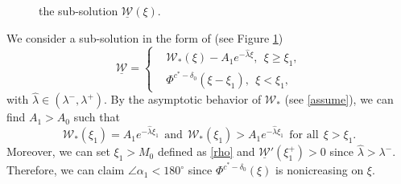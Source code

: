 \documentclass[11pt,a4paper]{article}
\numberwithin{equation}{section}
\numberwithin{figure}{section}
\begin{document}
\begin{figure}
\begin{center}
\caption{the sub-solution $\underline{\mathcal{W}}(\xi)$.}\label{Figure sub solution}
\end{center}
\end{figure}

We consider a sub-solution in the form of (see Figure \ref{Figure sub solution}) 
\begin{equation*}%
\underline{\mathcal W}=\left\{
\begin{aligned}
&\mathcal W_*(\xi)-A_1e^{-\hat\lambda\xi},\ \ \xi\ge\xi_1,\\
&\Phi^{c^*-\delta_0}(\xi-\xi_1),\ \ \xi<\xi_1,
\end{aligned}
\right.
\end{equation*}
with $\hat\lambda\in (\lambda^-,\lambda^+)$.
By the asymptotic behavior of $\mathcal W_*$ (see \eqref{assume}), we can find $A_1>A_0$ such that 
$$\mathcal W_*(\xi_1)=A_1e^{-\hat\lambda\xi_1}\ \ \text{and}\ \ \mathcal W_*(\xi_1)>A_1e^{-\hat\lambda\xi_1}\ \ \text{for all}\ \ \xi>\xi_1.$$
Moreover, we can set $\xi_1>M_0$ defined as \eqref{rho} and $\underline{\mathcal W}'(\xi_1^+)>0$ since $\hat\lambda>\lambda^-$. Therefore, we can claim $\angle\alpha_1<180^{\circ}$ since  $\Phi^{c^*-\delta_0}(\xi)$ is nonicreasing on $\xi$.
\end{document}
